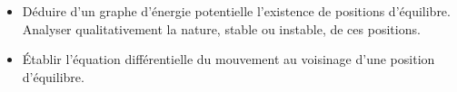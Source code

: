 \documentclass[../../main/main.tex]{subfiles}
\begin{document}
\begin{prgm}
\begin{tcb}
\begin{itemize}
			\item Déduire d’un graphe d’énergie potentielle l’existence de positions
			      d’équilibre. Analyser qualitativement la nature, stable ou instable,
			      de ces positions.

			\item Établir l’équation différentielle du mouvement au voisinage d’une
			      position d’équilibre.
		\end{itemize}
	\end{tcb}
\end{prgm}

\vspace*{\fill}

\newpage

\vspace*{\fill}
\minitoc
\vspace*{\fill}

\newpage
\end{document}
